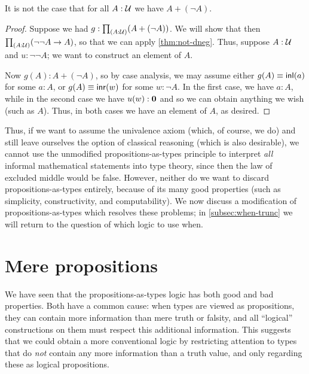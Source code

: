 \begin{cor}\label{thm:not-lem}
  It is not the case that for all $A:\mathcal{U}$ we have $A+(\neg A)$.
\end{cor}
\begin{proof}
  Suppose we had $g:\prd{A:\UU} (A+(\neg A))$.
  We will show that then $\prd{A:\UU} (\neg\neg A \to A)$, so that we can apply \autoref{thm:not-dneg}.
  Thus, suppose $A:\mathcal{U}$ and $u:\neg\neg A$; we want to construct an element of $A$.

  Now $g(A):A+(\neg A)$, so by case analysis, we may assume either $g(A)\equiv {\mathsf{inl}}(a)$ for some $a:A$, or $g(A)\equiv {\mathsf{inr}}(w)$ for some $w:\neg A$.
  In the first case, we have $a:A$, while in the second case we have $u(w):\mathbf{0}$ and so we can obtain anything we wish (such as $A$).
  Thus, in both cases we have an element of $A$, as desired.
\end{proof}

Thus, if we want to assume the univalence axiom (which, of course, we do) and still leave ourselves the option of classical reasoning (which is also desirable), we cannot use the unmodified propositions-as-types principle to interpret \emph{all} informal mathematical statements into type theory, since then the law of excluded middle would be false.
However, neither do we want to discard propositions-as-types entirely, because of its many good properties (such as simplicity, constructivity, and computability).
We now discuss a modification of propositions-as-types which resolves these problems; in \autoref{subsec:when-trunc} we will return to the question of which logic to use when.
%
%
%

\section{Mere propositions}
\label{subsec:hprops}

%
%
%
We have seen that the propositions-as-types logic has both good and bad properties.
Both have a common cause: when types are viewed as propositions, they can contain more information than mere truth or falsity, and all ``logical'' constructions on them must respect this additional information.
This suggests that we could obtain a more conventional logic by restricting attention to types that do \emph{not} contain any more information than a truth value, and only regarding these as logical propositions.

